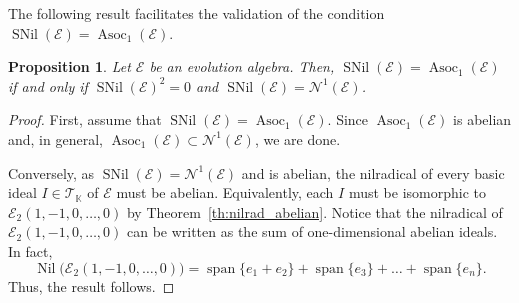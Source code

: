 \documentclass[12pt,reqno]{amsart}
\newtheorem{proposition}[theorem]{Proposition}
\theoremstyle{definition}
\theoremstyle{remark}
\DeclareMathOperator{\spa}{span}
\DeclareMathOperator{\asoc}{Asoc}
\DeclareMathOperator{\nil}{Nil}
\DeclareMathOperator{\snil}{SNil}
\numberwithin{equation}{section}
\begin{document}
The following result facilitates the validation of the condition $\snil(\mathcal{E}) = \asoc_1(\mathcal{E})$.

\begin{proposition}\label{prop:snil_ab}
	Let $\mathcal{E}$ be an evolution algebra. Then, $\snil(\mathcal{E})=\asoc_1(\mathcal{E})$ if and only if $\snil(\mathcal{E})^2=0$ and $\snil(\mathcal{E})=\mathcal{N}^1(\mathcal{E})$.
\end{proposition}
\begin{proof}
	First, assume that $\snil(\mathcal{E})=\asoc_1(\mathcal{E})$. Since $\asoc_1(\mathcal{E})$ is abelian and, in general, $\asoc_1(\mathcal{E})\subset\mathcal{N}^1(\mathcal{E})$, we are done.
	
	Conversely, as $\snil(\mathcal{E})=\mathcal{N}^1(\mathcal{E})$ and is abelian, the nilradical of every basic ideal $I\in\mathcal{T}_\mathbb{K}$ of $\mathcal{E}$ must be abelian. Equivalently, each $I$ must be isomorphic to $\mathcal{E}_2(1,-1,0,\dots,0)$ by Theorem~\ref{th:nilrad_abelian}. Notice that the nilradical of $\mathcal{E}_2(1,-1,0,\dots,0)$ can be written as the sum of one-dimensional abelian ideals. In fact,
	$$\nil\big(\mathcal{E}_2(1,-1,0,\dots,0)\big)=\spa\{e_1+e_2\}+\spa\{e_3\}+\dots+\spa\{e_n\}.$$
	Thus, the result follows.
\end{proof}
\end{document}
